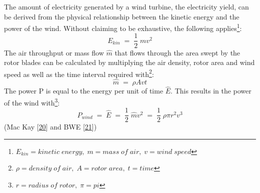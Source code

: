 \documentclass[a4paper,11pt]{article}
\begin{document}
The amount of electricity generated by a wind turbine, the electricity yield, can be derived from the physical relationship between the kinetic energy and the power of the wind. Without claiming to be exhaustive, the following applies\footnote{\(E_{kin}= kinetic\; energy,\; m=mass\; of\; air,\; v= wind\;speed\)}:
\begin{equation}
E_{kin}\; =\; \frac{1}{2}\;mv^2
\end{equation}
The air throughput or mass flow \(\hat{m}\) that flows through the area swept by the rotor blades can be calculated by multiplying the air density, rotor area and wind speed as well as the time interval required with\footnote{\(\rho= density\; of\; air,\; A= rotor\; area,\; t=time\)}:
\begin{equation}
\hat{m}\;=\;\rho A vt
\end{equation}
The power P is equal to the energy per unit of time \(\hat{E}\). This results in the power of the wind with\footnote{\(r= radius\; of\; rotor, \; \pi=pi\)}:
\begin{equation}
P_{wind}\;=\;\hat{E}\;=\;\frac{1}{2}\;\hat{m}v^2\;=\;\frac{1}{2}\; \rho \pi r^2 v^3
\end{equation}
(Mac Kay {[}\protect\hyperlink{ref-DavidJCMacKay.2009}{20}{]} and BWE {[}\protect\hyperlink{ref-BWE.2021}{21}{]})
\end{document}
